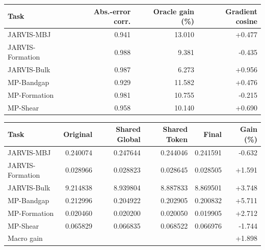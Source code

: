 \documentclass[a4paper,fleqn]{cas-sc}
\begin{document}
\begin{center}
\begin{minipage}{\linewidth}
\label{tab:sbdvf_detail}\centering\scriptsize
\begin{tabular}{lrrr}\toprule
Task&Abs.-error corr.&Oracle gain (\%)&Gradient cosine\\\midrule
JARVIS-MBJ&0.941&13.010&+0.477\\
JARVIS-Formation&0.988&9.381&-0.435\\
JARVIS-Bulk&0.987&6.273&+0.956\\
MP-Bandgap&0.929&11.582&+0.476\\
MP-Formation&0.981&10.755&-0.215\\
MP-Shear&0.958&10.140&+0.690\\\bottomrule
\end{tabular}
\end{minipage}
\end{center}

\begin{center}
\begin{minipage}{\linewidth}
\label{tab:sbdvf_compact}\centering\scriptsize
\begin{tabular}{lrrrrr}\toprule
Task&Original&Shared Global&Shared Token&Final&Gain (\%)\\\midrule
JARVIS-MBJ&0.240074&0.247644&0.244046&0.241591&-0.632\\
JARVIS-Formation&0.028966&0.028823&0.028645&0.028505&+1.591\\
JARVIS-Bulk&9.214838&8.939804&8.887833&8.869501&+3.748\\
MP-Bandgap&0.212996&0.204922&0.202905&0.200832&+5.711\\
MP-Formation&0.020460&0.020200&0.020050&0.019905&+2.712\\
MP-Shear&0.065829&0.066835&0.068522&0.066976&-1.744\\\midrule
Macro gain&&&&&+1.898\\
\bottomrule\end{tabular}
\end{minipage}
\end{center}


\FloatBarrier
\end{document}
